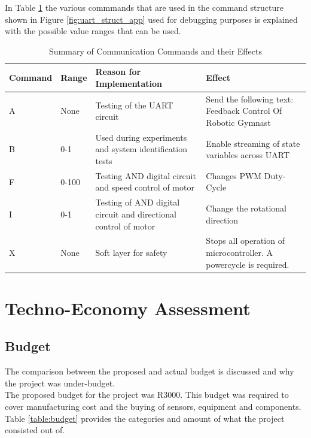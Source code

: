 In Table \ref{table:uart_commands} the various commmands that are used in the command structure shown in Figure \ref{fig:uart_struct_app} used for debugging purposes is explained with the possible value ranges that can be used.


\begin{table}[h]
	\centering
	\begin{tabular}{|p{2cm}|p{1cm}|p{5cm}|p{5cm}|}
		\hline
		Command & Range &  Reason for Implementation & Effect \\
		\hline
		\hline
		A & None & Testing of the UART circuit & Send the following text: Feedback Control Of Robotic Gymnast\\
		\hline
		B & 0-1 & Used during experiments and system identification tests& Enable streaming of state variables across UART \\ 
		\hline
		F & 0-100 &  Testing AND digital circuit and speed control of motor& Changes PWM Duty-Cycle \\
		\hline
		I & 0-1 & Testing of AND digital circuit and directional control of motor & Change the rotational direction \\
		\hline
		X & None & Soft layer for safety & Stops all operation of microcontroller. A powercycle is required.   \\
		\hline
	
	\end{tabular}
	\caption{Summary of Communication Commands and their Effects}
	\label{table:uart_commands}

\end{table}


\newpage


%





\section{Techno-Economy Assessment}
\label{sec:techno_eco}

\subsection{Budget}
The comparison between the proposed and actual budget is discussed and why the project was under-budget.\\

The proposed budget for the project was R3000. This budget was required to cover manufacturing cost and the buying of sensors, equipment and components. Table \ref{table:budget} provides the categories and amount of what the project consisted out of.\\

